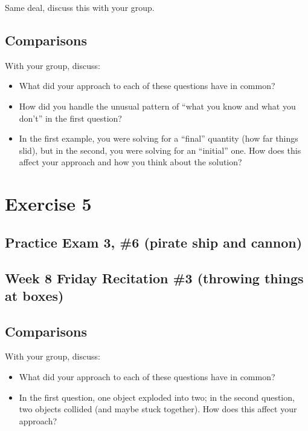 \documentclass[12pt]{article}
\begin{document}
Same deal, discuss this with your group.


\subsection{Comparisons}

With your group, discuss:

\begin{itemize}
	\item What did your approach to each of these questions have in common?
	\item How did you handle the unusual pattern of ``what you know and what you don't'' in the first question?
	\item In the first example, you were solving for a ``final'' quantity (how far things slid), but in the second, you were solving for an ``initial'' one. How does this affect your approach and how you think about the solution?
\end{itemize}

\newpage

\section{Exercise 5}

\subsection{Practice Exam 3, \#6 (pirate ship and cannon)}

\subsection{Week 8 Friday Recitation \#3 (throwing things at boxes)}

\subsection{Comparisons}

With your group, discuss:

\begin{itemize}
	\item What did your approach to each of these questions have in common?
	\item In the first question, one object exploded into two; in the second question, two objects collided (and maybe stuck together). How does this affect your approach?
\end{itemize}
\end{document}
